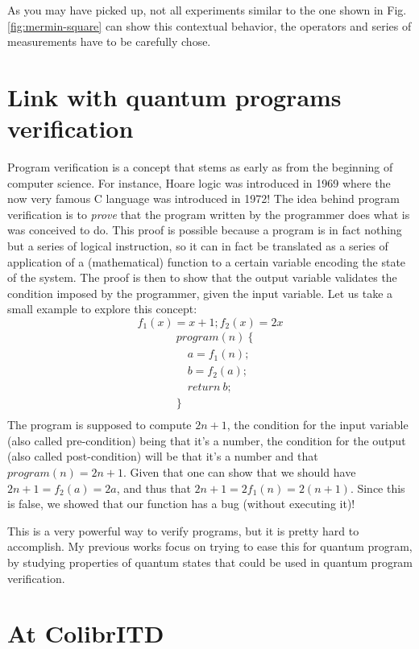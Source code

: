 \documentclass{article}
\begin{document}
As you may have picked up, not all experiments similar to the one shown in Fig.
\ref{fig:mermin-square} can show this contextual behavior, the operators and
series of measurements have to be carefully chose.

\section{Link with quantum programs verification}
\label{sec:link_with_quantum_programs_verification}

Program verification is a concept that stems as early as from the beginning of
computer science. For instance, Hoare logic \cite{Hoa69} was introduced in 1969
where the now very famous C language was introduced in 1972! The idea behind
program verification is to \emph{prove} that the program written by the
programmer does what is was conceived to do. This proof is possible because a
program is in fact nothing but a series of logical instruction, so it can in fact
be translated as a series of application of a (mathematical) function to a
certain variable encoding the state of the system. The proof is then to show that
the output variable validates the condition imposed by the programmer, given the
input variable. Let us take a small example to explore this concept:
$$f_1(x) = x+1; f_2(x) = 2x$$
\begin{align*}
& program (n)\ \{\\
& \quad  a = f_1(n);\\
& \quad  b = f_2(a);\\
& \quad  return\ b;\\
& \}\\
\end{align*}
The program is supposed to compute $2n+1$, the condition for the input variable
(also called pre-condition) being that it's a number, the condition for the
output (also called post-condition) will be that it's a number and that 
$program(n)=2n+1$. Given that one can show that we should have $2n+1=f_2(a)=2a$,
and thus that $2n+1=2f_1(n)=2(n+1)$. Since this is false, we showed that our
function has a bug (without executing it)!

This is a very powerful way to verify programs, but it is pretty hard to
accomplish. My previous works focus on trying to ease this for quantum program,
by studying properties of quantum states that could be used in quantum program
verification. 

\section*{At ColibrITD}



\end{document}
